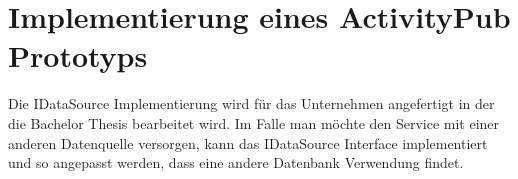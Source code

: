 
\chapter{Implementierung eines ActivityPub Prototyps}
Die IDataSource Implementierung wird für das Unternehmen angefertigt in der die Bachelor Thesis bearbeitet wird. Im Falle man möchte den Service mit einer anderen Datenquelle versorgen, kann das IDataSource Interface implementiert und so angepasst werden, dass eine andere Datenbank Verwendung findet.\\

